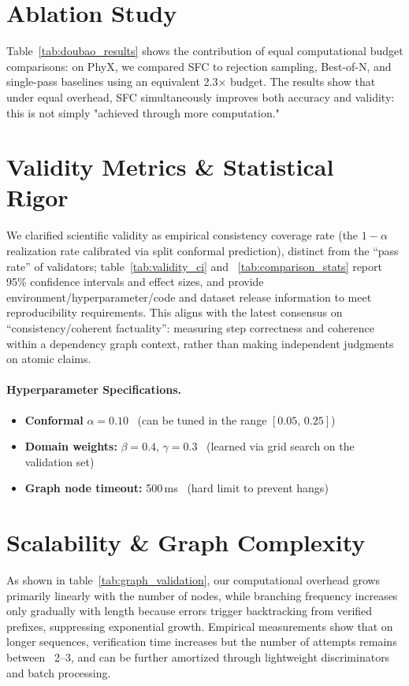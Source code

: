 \documentclass{uai2026} %
\theoremstyle{remark}
\theoremstyle{plain}
\theoremstyle{definition}
\begin{document}
\section{Ablation Study}
\label{app:ablate}
Table~\ref{tab:doubao_results} shows the contribution of equal computational budget comparisons: on PhyX, we compared SFC to rejection sampling, Best-of-N, and single-pass baselines using an equivalent 2.3× budget. The results show that under equal overhead, SFC simultaneously improves both accuracy and validity: this is not simply "achieved through more computation."

\section{Validity Metrics \& Statistical Rigor}

We clarified scientific validity as empirical consistency coverage rate 
(the $1 - \alpha$ realization rate calibrated via split conformal prediction), 
distinct from the ``pass rate'' of validators; 
table~\ref{tab:validity_ci} and ~\ref{tab:comparison_stats} report 95\% confidence intervals and effect sizes, 
and provide environment/hyperparameter/code and dataset release information to meet reproducibility requirements. 
This aligns with the latest consensus on ``consistency/coherent factuality'': 
measuring step correctness and coherence within a dependency graph context, 
rather than making independent judgments on atomic claims.



\paragraph{Hyperparameter Specifications.}
\begin{itemize}
    \item \textbf{Conformal} $\alpha = 0.10$ \, (can be tuned in the range $[0.05,\, 0.25]$)
    \item \textbf{Domain weights:} $\beta = 0.4$, $\gamma = 0.3$ \, (learned via grid search on the validation set)
    \item \textbf{Graph node timeout:} 500\,ms \, (hard limit to prevent hangs)
\end{itemize}
\section{Scalability \& Graph Complexity}


As shown in table~\ref{tab:graph_validation}, our computational overhead grows primarily linearly with the number of nodes, while branching frequency increases only gradually with length because errors trigger backtracking from verified prefixes, suppressing exponential growth. Empirical measurements show that on longer sequences, verification time increases but the number of attempts remains between ~2–3, and can be further amortized through lightweight discriminators and batch processing.
\end{document}
